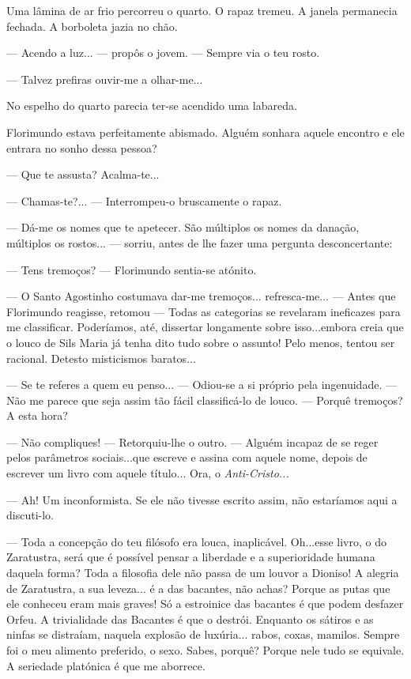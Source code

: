Uma lâmina de ar frio percorreu o quarto. O rapaz tremeu. A janela
permanecia fechada. A borboleta jazia no chão.

--- Acendo a luz... --- propôs o jovem. --- Sempre via o teu rosto.

--- Talvez prefiras ouvir-me a olhar-me...

No espelho do quarto parecia ter-se acendido uma labareda.

Florimundo estava perfeitamente abismado. Alguém sonhara aquele encontro
e ele entrara no sonho dessa pessoa?

--- Que te assusta? Acalma-te...

--- Chamas-te?... --- Interrompeu-o bruscamente o rapaz.

--- Dá-me os nomes que te apetecer. São múltiplos os nomes da danação,
múltiplos os rostos... --- sorriu, antes de lhe fazer uma pergunta
desconcertante:

--- Tens tremoços? --- Florimundo sentia-se atónito.

--- O Santo Agostinho costumava dar-me tremoços... refresca-me... ---  Antes
que Florimundo reagisse, retomou --- Todas as categorias se revelaram
ineficazes para me classificar. Poderíamos, até, dissertar longamente
sobre isso...embora creia que o louco de Sils Maria já tenha dito tudo
sobre o assunto! Pelo menos, tentou ser racional. Detesto misticismos
baratos...

--- Se te referes a quem eu penso... --- Odiou-se a si próprio pela
ingenuidade. --- Não me parece que seja assim tão fácil classificá-lo de
louco. ---  Porquê tremoços? A esta hora?

--- Não compliques! --- Retorquiu-lhe o outro. --- Alguém incapaz de se reger
pelos parâmetros sociais...que escreve e assina com aquele nome, depois
de escrever um livro com aquele título... Ora, o \emph{Anti-Cristo...}

--- Ah! Um inconformista. Se ele não tivesse escrito assim, não estaríamos
aqui a discuti-lo.

--- Toda a concepção do teu filósofo era louca, inaplicável. Oh...esse
livro, o do Zaratustra, será que é possível pensar a liberdade e a
superioridade humana daquela forma? Toda a filosofia dele não passa de
um louvor a Dioniso! A alegria de Zaratustra, a sua leveza... é a das
bacantes, não achas? Porque as putas que ele conheceu eram mais graves!
Só a estroinice das bacantes é que podem desfazer Orfeu. A trivialidade
das Bacantes é que o destrói. Enquanto os sátiros e as ninfas se
distraíam, naquela explosão de luxúria... rabos, coxas, mamilos. Sempre
foi o meu alimento preferido, o sexo. Sabes, porquê? Porque nele tudo se
equivale. A seriedade platónica é que me aborrece.

